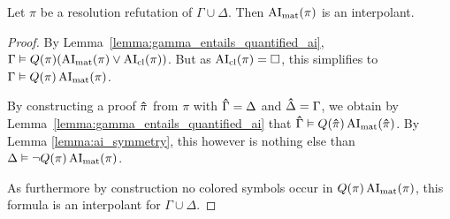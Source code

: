 \documentclass[,%
	draft=false,%
	numbers=noendperiod
	11pt,
	a4paper,
	oneside,%
	openany,
]{memoir}
\begin{document}
\begin{thm}
	Let $\pi$ be a resolution refutation of $\Gamma\cup\Delta$.
	Then $\operatorname{AI}_\mathrm{mat}( \pi )$ is an interpolant.
\end{thm}
\begin{proof}
	By Lemma~\ref{lemma:gamma_entails_quantified_ai},
	$\Gamma \vDash Q(\pi)(\operatorname{AI}_\mathrm{mat}(\pi) \lor \operatorname{AI}_\mathrm{cl}(\pi))$.
	But as $\operatorname{AI}_\mathrm{cl}(\pi) = \square$, this simplifies to
	$\Gamma \vDash Q(\pi)\operatorname{AI}_\mathrm{mat}(\pi)$.

	By constructing a proof $\bm\hat \pi$ from $\pi$ with $\bm\hat \Gamma = \Delta$ and $\bm\hat \Delta = \Gamma$, we obtain by Lemma~\ref{lemma:gamma_entails_quantified_ai} that $\bm\hat\Gamma \vDash Q(\bm\hat \pi)\operatorname{AI}_\mathrm{mat}(\bm\hat \pi)$.
	By Lemma \ref{lemma:ai_symmetry}, this however is nothing else than
	$\Delta \vDash \lnot Q(\pi) \operatorname{AI}_\mathrm{mat}(\pi)$. 

	As furthermore by construction no colored symbols occur in $Q(\pi) \operatorname{AI}_\mathrm{mat}(\pi)$, this formula is an interpolant for $\Gamma\cup\Delta$.
\end{proof}
\end{document}
